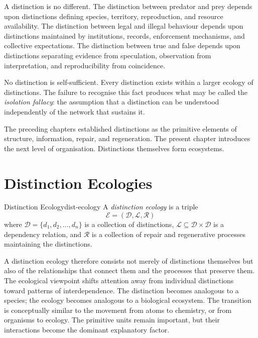 \documentclass[12pt,twoside,openright]{book}
\begin{document}
A distinction is no different. The distinction between
predator and prey depends upon distinctions defining
species, territory, reproduction, and resource
availability. The distinction between legal and illegal
behaviour depends upon distinctions maintained by
institutions, records, enforcement mechanisms, and
collective expectations. The distinction between true and
false depends upon distinctions separating evidence from
speculation, observation from interpretation, and
reproducibility from coincidence.

No distinction is self-sufficient. Every distinction exists
within a larger ecology of distinctions. The failure to
recognise this fact produces what may be called the
\emph{isolation fallacy}: the assumption that a distinction
can be understood independently of the network that
sustains it.

The preceding chapters established distinctions as the
primitive elements of structure, information, repair, and
regeneration. The present chapter introduces the next level
of organisation. Distinctions themselves form ecosystems.

\section{Distinction Ecologies}
\label{sec:ch12-ecologies}

\begin{definition}{Distinction Ecology}{dist-ecology}
  A \emph{distinction ecology} is a triple
  \[
    \mathcal{E} = (\mathcal{D}, \mathcal{L}, \mathcal{R})
  \]
  where $\mathcal{D} = \{d_1,d_2,\ldots,d_n\}$ is a
  collection of distinctions, $\mathcal{L} \subseteq
  \mathcal{D}\times\mathcal{D}$ is a dependency relation,
  and $\mathcal{R}$ is a collection of repair and
  regenerative processes maintaining the distinctions.
\end{definition}

A distinction ecology therefore consists not merely of
distinctions themselves but also of the relationships that
connect them and the processes that preserve them. The
ecological viewpoint shifts attention away from individual
distinctions toward patterns of interdependence. The
distinction becomes analogous to a species; the ecology
becomes analogous to a biological ecosystem. The transition
is conceptually similar to the movement from atoms to
chemistry, or from organisms to ecology. The primitive
units remain important, but their interactions become the
dominant explanatory factor.
\end{document}

